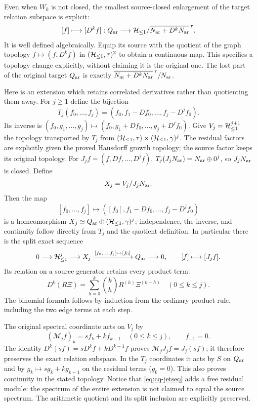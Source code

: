 Even when $W_k$ is not closed, the smallest source-closed enlargement
of the target relation subspace is explicit:
\begin{equation}\label{eq:cq-target}
 [f]\longmapsto[D^kf]:
 Q_{\rm ar}\longrightarrow
 \mathcal H_{\leq 1}/\overline{N_{\rm ar}+D^kN_{\rm ar}}^{\,\tau}.
\end{equation}
It is well defined algebraically. Equip its source with the quotient
of the graph topology $f\mapsto(f,D^kf)$ in
$(\mathcal H_{\leq 1},\tau)^2$ to obtain a continuous map. This specifies a
topology change explicitly, without claiming it is the original one.
The lost part of the original target $Q_{\rm ar}$ is exactly
$\overline{N_{\rm ar}+D^kN_{\rm ar}}^{\,\tau}/N_{\rm ar}$.

Here is an extension which retains correlated derivatives rather than
quotienting them away. For $j\geq1$ define the bijection
\[
 T_j(f_0,\ldots,f_j)
   =(f_0,f_1-Df_0,\ldots,f_j-D^jf_0).
\]
Its inverse is $(f_0,g_1,\ldots,g_j)\mapsto
(f_0,g_1+Df_0,\ldots,g_j+D^jf_0)$.
Give $V_j=\mathcal H_{\leq 1}^{j+1}$ the topology transported by $T_j$ from
$(\mathcal H_{\leq 1},\tau)\times(\mathcal H_{\leq 1},\gamma)^j$. The residual factors
are explicitly given the proved Hausdorff growth topology; the
source factor keeps its original topology. For $J_jf=(f,Df,\ldots,D^jf)$,
$T_j(J_jN_{\rm ar})=N_{\rm ar}\oplus0^j$, so $J_jN_{\rm ar}$ is closed.
Define
\begin{equation}\label{eq:cq-jetextension}
 X_j=V_j/J_jN_{\rm ar}.
\end{equation}
Then the map
\[
 [f_0,\ldots,f_j]\longmapsto
 ([f_0],f_1-Df_0,\ldots,f_j-D^jf_0)
\]
is a homeomorphism $X_j\simeq Q_{\rm ar}\oplus(\mathcal H_{\leq 1},\gamma)^j$; independence,
the inverse, and continuity follow directly from $T_j$ and the
quotient definition. In particular there is the split exact sequence
\begin{equation}\label{eq:cq-jetseq}
 0\longrightarrow\mathcal H_{\leq 1}^j\longrightarrow X_j
 \xrightarrow{[f_0,\ldots,f_j]\mapsto[f_0]}Q_{\rm ar}
 \longrightarrow0,
 \qquad [f]\longmapsto[J_jf].
\end{equation}
Its relation on a source generator retains every product term:
\begin{equation}\label{eq:cq-rawjet}
 D^k(R\Xi)=\sum_{h=0}^k\binom kh R^{(h)}\Xi^{(k-h)}
                    \quad(0\leq k\leq j).
\end{equation}
The binomial formula follows by induction from the ordinary product
rule, including the two edge terms at each step.

The original spectral coordinate acts on $V_j$ by
\[
 (\mathcal M_j f)_k=s f_k+k f_{k-1}\quad(0\leq k\leq j),
 \qquad f_{-1}=0.
\]
The identity $D^k(sf)=sD^kf+kD^{k-1}f$ proves
$\mathcal M_jJ_jf=J_j(sf)$; it therefore preserves the exact
relation subspace. In the $T_j$ coordinates it acts by $S$ on
$Q_{\rm ar}$ and by $g_k\mapsto sg_k+kg_{k-1}$ on the residual terms
($g_0=0$). This also proves continuity in the stated topology.
Notice that \eqref{eq:cq-jetseq} adds a free residual module:
the spectrum of the entire extension is not claimed to equal the
source spectrum. The arithmetic quotient and its split inclusion
are explicitly preserved.

